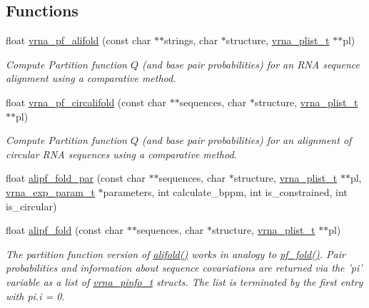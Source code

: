 \subsection*{Functions}
\begin{DoxyCompactItemize}
\item 
float \hyperlink{group__consensus__pf__fold_gaef750636c70e597a85ee139197a4350d}{vrna\-\_\-pf\-\_\-alifold} (const char $\ast$$\ast$strings, char $\ast$structure, \hyperlink{group__data__structures_ga8e4eb5e1bfc95776559575beb359af87}{vrna\-\_\-plist\-\_\-t} $\ast$$\ast$pl)
\begin{DoxyCompactList}\small\item\em Compute Partition function $Q$ (and base pair probabilities) for an R\-N\-A sequence alignment using a comparative method. \end{DoxyCompactList}\item 
float \hyperlink{group__consensus__pf__fold_ga017209394a4c1e68d96cd47e61d16d25}{vrna\-\_\-pf\-\_\-circalifold} (const char $\ast$$\ast$sequences, char $\ast$structure, \hyperlink{group__data__structures_ga8e4eb5e1bfc95776559575beb359af87}{vrna\-\_\-plist\-\_\-t} $\ast$$\ast$pl)
\begin{DoxyCompactList}\small\item\em Compute Partition function $Q$ (and base pair probabilities) for an alignment of circular R\-N\-A sequences using a comparative method. \end{DoxyCompactList}\item 
float \hyperlink{group__consensus__pf__fold_ga5e8d54e41bf3d5b6e535d5bdb33c416e}{alipf\-\_\-fold\-\_\-par} (const char $\ast$$\ast$sequences, char $\ast$structure, \hyperlink{group__data__structures_ga8e4eb5e1bfc95776559575beb359af87}{vrna\-\_\-plist\-\_\-t} $\ast$$\ast$pl, \hyperlink{group__energy__parameters_ga01d8b92fe734df8d79a6169482c7d8d8}{vrna\-\_\-exp\-\_\-param\-\_\-t} $\ast$parameters, int calculate\-\_\-bppm, int is\-\_\-constrained, int is\-\_\-circular)
\item 
float \hyperlink{group__consensus__pf__fold_gaa150d3ba7b009a1c27cb6f0eb197f6b4}{alipf\-\_\-fold} (const char $\ast$$\ast$sequences, char $\ast$structure, \hyperlink{group__data__structures_ga8e4eb5e1bfc95776559575beb359af87}{vrna\-\_\-plist\-\_\-t} $\ast$$\ast$pl)
\begin{DoxyCompactList}\small\item\em The partition function version of \hyperlink{group__consensus__mfe__fold_ga4cf00f0659e5f0480335d69e797f05b1}{alifold()} works in analogy to \hyperlink{group__pf__fold_gadc3db3d98742427e7001a7fd36ef28c2}{pf\-\_\-fold()}. Pair probabilities and information about sequence covariations are returned via the 'pi' variable as a list of \hyperlink{group__aln__utils_ga6660dfca23debee7306e0cd53341263f}{vrna\-\_\-pinfo\-\_\-t} structs. The list is terminated by the first entry with pi.\-i = 0. \end{DoxyCompactList}\item 

\end{DoxyCompactItemize}

